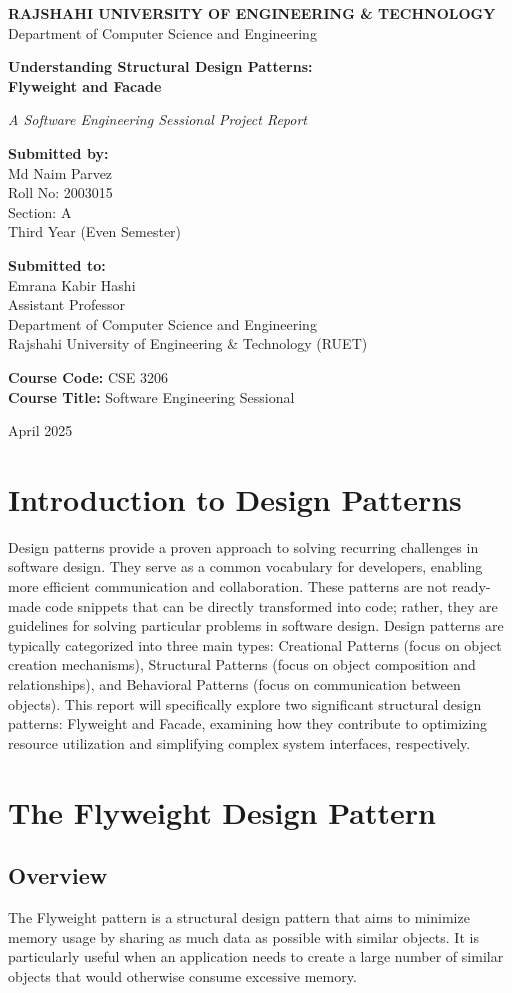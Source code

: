 \documentclass[12pt,a4paper]{article}
\newcommand{\maketitlepage}{
    \begin{titlepage}
        \centering
        \vspace*{0.5cm}
        {\Huge \textbf{RAJSHAHI UNIVERSITY OF ENGINEERING \& TECHNOLOGY}}
        \vspace*{0.5cm}
        {\Large Department of Computer Science and Engineering}
        
        \vspace*{2.5cm}
        
        {\huge\bfseries Understanding Structural Design Patterns: \\ Flyweight and Facade\par} %
        \vspace{0.5cm}
        {\Large \textit{A Software Engineering Sessional Project Report}\par} %
        
        \vspace{2cm}
        
        \begin{flushleft}
        \large \textbf{Submitted by:}\\
        \large Md Naim Parvez \\ %
        \large Roll No: 2003015 \\
        \large Section: A \\
        \large Third Year (Even Semester) \\ %
        \end{flushleft}
        
        \vspace{1cm}
        
        \begin{flushleft}
        \large \textbf{Submitted to:}\\
        \large Emrana Kabir Hashi \\
        \large Assistant Professor \\
        \large Department of Computer Science and Engineering \\
        \large Rajshahi University of Engineering \& Technology (RUET) \\
        \end{flushleft}
        
        \vspace{1cm}
        {\large \textbf{Course Code:} CSE 3206} \\
        {\large \textbf{Course Title:} Software Engineering Sessional}
        
        \vfill 
        
        {\large April 2025\par} %
    \end{titlepage}
}
\begin{document}
\maketitlepage %

\clearpage %
\tableofcontents %
\clearpage %


\section{Introduction to Design Patterns}
Design patterns provide a proven approach to solving recurring challenges in software design. They serve as a common vocabulary for developers, enabling more efficient communication and collaboration. These patterns are not ready-made code snippets that can be directly transformed into code; rather, they are guidelines for solving particular problems in software design. Design patterns are typically categorized into three main types: Creational Patterns (focus on object creation mechanisms), Structural Patterns (focus on object composition and relationships), and Behavioral Patterns (focus on communication between objects). This report will specifically explore two significant structural design patterns: Flyweight and Facade, examining how they contribute to optimizing resource utilization and simplifying complex system interfaces, respectively.

\section{The Flyweight Design Pattern}

\subsection{Overview}
The Flyweight pattern is a structural design pattern that aims to minimize memory usage by sharing as much data as possible with similar objects. It is particularly useful when an application needs to create a large number of similar objects that would otherwise consume excessive memory.
\end{document}
